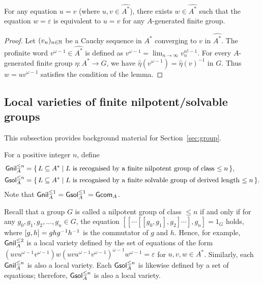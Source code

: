 \begin{lemma}\label{lem:group-profinite-identity}
  For any equation \(u = v\) (where \(u, v \in \widehat{A^*}\)),
  there exists \(w \in \widehat{A^*}\) such that the equation \(w = \varepsilon\) is equivalent to \(u = v\) for any \(A\)-generated finite group.
\end{lemma}
\begin{proof}
  Let \((v_n)_{n \in \mathbb{N}}\) be a Cauchy sequence in \(A^*\) converging to \(v\) in \(\widehat{A^*}\).
  The profinite word \(v^{\omega - 1} \in \widehat{A^*}\) is defined as \(v^{\omega - 1} = \lim_{n \to \infty} v_n^{n! - 1}\).
  For every \(A\)-generated finite group \(\eta\colon A^* \to G\), we have \(\hat{\eta}(v^{\omega - 1}) = \hat{\eta}(v)^{-1}\) in \(G\).
  Thus \(w = u v^{\omega - 1}\) satisfies the condition of the lemma.
\end{proof}

\subsection{Local varieties of finite nilpotent/solvable groups}
This subsection provides background material for Section~\ref{sec:group}.

\begin{definition}
  For a positive integer \(n\), define
  \begin{align*}
    \gnil_A^{\leq n} &\defeq \set{L \subseteq A^*}{\text{\(L\) is recognised by a finite nilpotent group of class \(\leq n\)}},\\
    \gsol_A^{\leq n} &\defeq \set{L \subseteq A^*}{\text{\(L\) is recognised by a finite solvable group of derived length \(\leq n\)}}.
  \end{align*}
  Note that \(\mathsf{Gnil}_A^{\leq 1} = \mathsf{Gsol}_A^{\leq 1} = \mathsf{Gcom}_A\).
\end{definition}

Recall that a group \(G\) is called a nilpotent group of class \(\leq n\) if and only if for any \(g_0, g_1, g_2, \dotsc, g_n \in G\),
the equation \([[\dotsm[[g_0, g_1], g_2]\dotsm], g_n] = 1_G\) holds,
where \([g, h] = g h g^{-1} h^{-1}\) is the commutator of \(g\) and \(h\).
Hence, for example, \(\mathsf{Gnil}_A^{\leq 2}\) is a local variety defined by the set of equations of the form
\((u v u^{\omega - 1} v^{\omega - 1}) w (u v u^{\omega - 1} v^{\omega - 1})^{\omega - 1} w^{\omega - 1} = \varepsilon\) for \(u, v, w \in A^*\).
Similarly, each \(\mathsf{Gnil}_A^{\leq n}\) is also a local variety.
Each \(\mathsf{Gsol}_A^{\leq n}\) is likewise defined by a set of equations;
therefore, \(\mathsf{Gsol}_A^{\leq n}\) is also a local variety.

